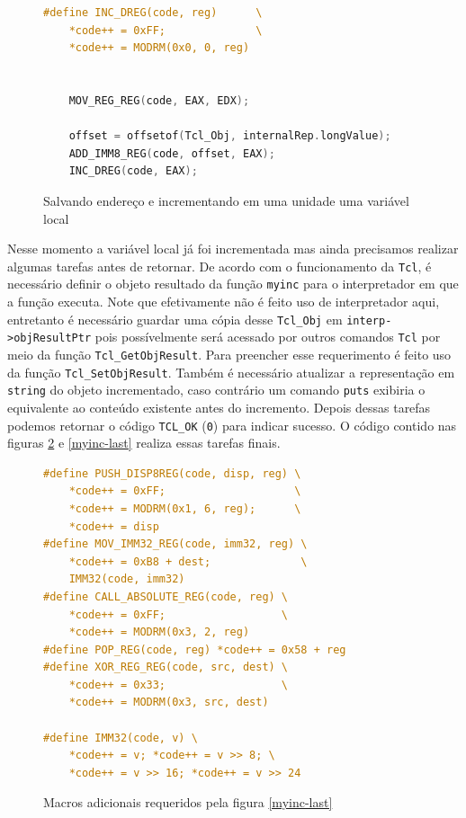 \begin{figure}[h]
  \centering
  \begin{lstlisting}[language=C]
#define INC_DREG(code, reg)      \
    *code++ = 0xFF;              \
    *code++ = MODRM(0x0, 0, reg)


    MOV_REG_REG(code, EAX, EDX);

    offset = offsetof(Tcl_Obj, internalRep.longValue);
    ADD_IMM8_REG(code, offset, EAX);
    INC_DREG(code, EAX);
  \end{lstlisting}
  \caption{Salvando endereço e incrementando em uma unidade uma variável local\label{inc-tclobj}}
\end{figure}

Nesse momento a variável local já foi incrementada mas ainda
precisamos realizar algumas tarefas antes de retornar. De acordo com o
funcionamento da \texttt{Tcl}, é
necessário definir o objeto resultado da função \verb!myinc! para o
interpretador em que a função executa. Note que efetivamente não é feito
uso de interpretador aqui, entretanto é necessário guardar uma cópia desse
\verb!Tcl_Obj! em \verb!interp->objResultPtr! pois possívelmente será acessado
por outros comandos \texttt{Tcl} por meio da função \verb!Tcl_GetObjResult!.
Para preencher esse requerimento é feito uso da função \verb!Tcl_SetObjResult!.
Também é necessário atualizar a representação em
\verb!string! do objeto incrementado, caso contrário um comando
\verb!puts! exibiria o equivalente ao conteúdo existente antes do incremento.
Depois dessas tarefas podemos
retornar o código \verb!TCL_OK! (\verb!0!) para indicar sucesso.
O código contido nas figuras \ref{myinc-last-macros} e \ref{myinc-last}
realiza essas tarefas finais.

\begin{figure}[ht!]
  \centering
  \begin{lstlisting}[language=C]
#define PUSH_DISP8REG(code, disp, reg) \
    *code++ = 0xFF;                    \
    *code++ = MODRM(0x1, 6, reg);      \
    *code++ = disp
#define MOV_IMM32_REG(code, imm32, reg) \
    *code++ = 0xB8 + dest;              \
    IMM32(code, imm32)
#define CALL_ABSOLUTE_REG(code, reg) \
    *code++ = 0xFF;                  \
    *code++ = MODRM(0x3, 2, reg)
#define POP_REG(code, reg) *code++ = 0x58 + reg
#define XOR_REG_REG(code, src, dest) \
    *code++ = 0x33;                  \
    *code++ = MODRM(0x3, src, dest)

#define IMM32(code, v) \
    *code++ = v; *code++ = v >> 8; \
    *code++ = v >> 16; *code++ = v >> 24
  \end{lstlisting}
  \caption{Macros adicionais requeridos pela figura \ref{myinc-last}\label{myinc-last-macros}}
\end{figure}

